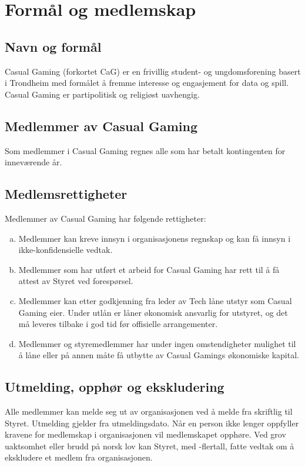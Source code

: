 \chapter{Formål og medlemskap}

\emptychapterspacing

\section{Navn og formål}
Casual Gaming (forkortet CaG) er en frivillig student- og ungdomsforening basert i Trondheim med formålet å fremme interesse og engasjement for data og spill. Casual Gaming er partipolitisk og religiøst uavhengig.

\section{Medlemmer av Casual Gaming}
Som medlemmer i Casual Gaming regnes alle som har betalt kontingenten for inneværende år.

\section{Medlemsrettigheter}
Medlemmer av Casual Gaming har følgende rettigheter:
\begin{enumerate}[a.]
    \item Medlemmer kan kreve innsyn i organisasjonens regnskap og kan få innsyn i ikke-konfiden\-sielle vedtak.
    \item Medlemmer som har utført et arbeid for Casual Gaming har rett til å få attest av Styret ved forespørsel.
    \item Medlemmer kan etter godkjenning fra leder av Tech låne utstyr som Casual Gaming eier. Under utlån er låner økonomisk ansvarlig for utstyret, og det må leveres tilbake i god tid før offisielle arrangementer.
    \item Medlemmer og styremedlemmer har under ingen omstendigheter mulighet til å låne eller på annen måte få utbytte av Casual Gamings økonomiske kapital.
\end{enumerate}

\section{Utmelding, opphør og ekskludering}
Alle medlemmer kan melde seg ut av organisasjonen ved å melde fra skriftlig til Styret. Utmelding gjelder fra utmeldingsdato. Når en person ikke lenger oppfyller kravene for medlemskap i organisasjonen vil medlemskapet opphøre. Ved grov uaktsomhet eller brudd på norsk lov kan Styret, med -flertall, fatte vedtak om å ekskludere et medlem fra organisasjonen.
